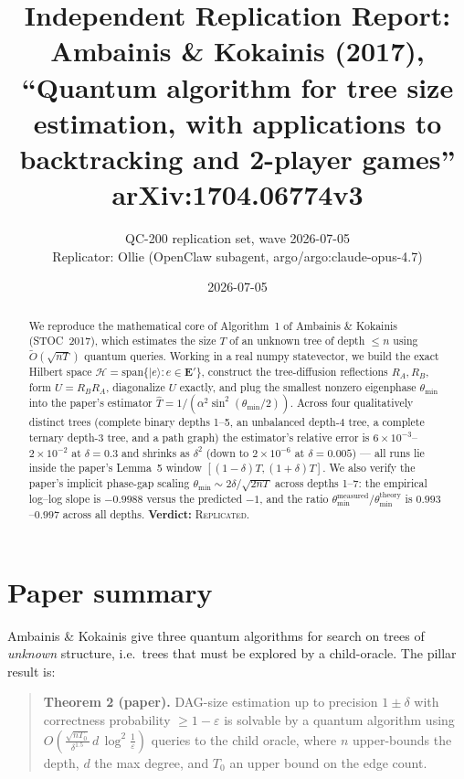 \documentclass[11pt]{article}
\title{Independent Replication Report: \\
Ambainis \& Kokainis (2017), \\
``Quantum algorithm for tree size estimation, with applications to backtracking and 2-player games'' \\
{\normalsize arXiv:1704.06774v3}}
\author{QC-200 replication set, wave 2026-07-05\\
Replicator: Ollie (OpenClaw subagent, argo/argo:claude-opus-4.7)}
\date{2026-07-05}
\begin{document}
\maketitle

\begin{abstract}
We reproduce the mathematical core of Algorithm~1 of Ambainis \& Kokainis
(STOC~2017), which estimates the size $T$ of an unknown tree of depth $\le n$
using $\tilde O(\sqrt{nT})$ quantum queries.  Working in a real
$\mathrm{numpy}$ statevector, we build the exact Hilbert space
$\mathcal H = \mathrm{span}\{|e\rangle : e \in \mathbf E'\}$, construct the
tree-diffusion reflections $R_A, R_B$, form $U = R_B R_A$, diagonalize $U$
exactly, and plug the smallest nonzero eigenphase $\theta_{\min}$ into the
paper's estimator
$\hat T = 1/(\alpha^2 \sin^2(\theta_{\min}/2))$.  Across four qualitatively
distinct trees (complete binary depths 1--5, an unbalanced depth-4 tree,
a complete ternary depth-3 tree, and a path graph) the estimator's relative
error is $6\!\times\!10^{-3}$--$2\!\times\!10^{-2}$ at $\delta=0.3$ and shrinks
as $\delta^2$ (down to $2\!\times\!10^{-6}$ at $\delta{=}0.005$) --- all runs
lie inside the paper's Lemma~5 window $[(1-\delta)T, (1+\delta)T]$.
We also verify the paper's implicit phase-gap scaling
$\theta_{\min} \sim 2\delta/\sqrt{2nT}$ across depths 1--7: the empirical
log--log slope is $-0.9988$ versus the predicted $-1$, and the ratio
$\theta_{\min}^{\text{measured}} / \theta_{\min}^{\text{theory}}$ is
$0.993$--$0.997$ across all depths.  \textbf{Verdict:} \textsc{Replicated}.
\end{abstract}

\section{Paper summary}
Ambainis \& Kokainis give three quantum algorithms for search on trees of
\emph{unknown} structure, i.e.\ trees that must be explored by a
child-oracle.  The pillar result is:

\begin{quote}
\textbf{Theorem 2 (paper).} DAG-size estimation up to precision $1 \pm \delta$
with correctness probability $\ge 1 - \varepsilon$ is solvable by a quantum
algorithm using $O\!\left( \frac{\sqrt{n T_0}}{\delta^{1.5}} \, d \, \log^2
\frac{1}{\varepsilon} \right)$ queries to the child oracle, where $n$ upper-bounds
the depth, $d$ the max degree, and $T_0$ an upper bound on the edge count.
\end{quote}
\end{document}
